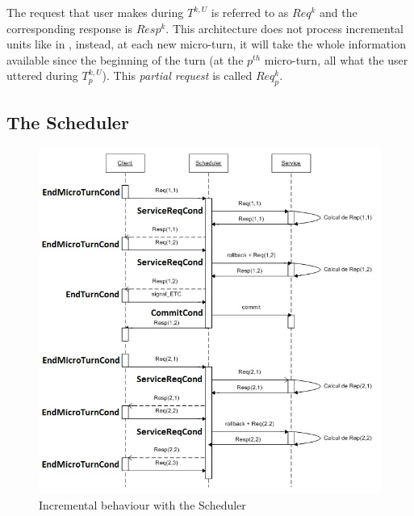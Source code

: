         The request that user makes during $T^{k,U}$ is referred to as $Req^k$ and the corresponding response is $Resp^k$. This architecture does not process incremental units like in \cite{Schlangen2011}, instead, at each new micro-turn, it will take the whole information available since the beginning of the turn (at the $p^{th}$ micro-turn, all what the user uttered during $T^{k,U}_p$). This \textit{partial request} is called $Req^k_p$.
        
    \subsection{The Scheduler}
    
    	\begin{figure}[ht]
          \centering
          \includegraphics[scale=0.8]{figures/SchedChrono.jpg}
          \caption{Incremental behaviour with the Scheduler}
          \label{fig:schedchrono}
        \end{figure}
    
